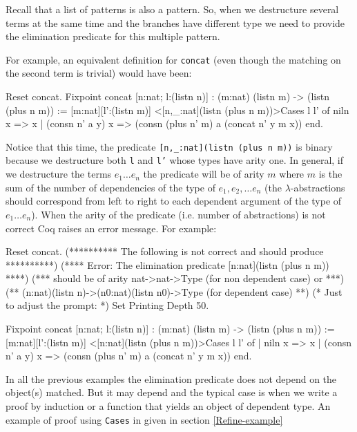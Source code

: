Recall that a list of patterns is also a pattern. So, when
we destructure several terms at the same time and the branches have
different type  we need to provide
the elimination predicate for this multiple pattern.

For example, an equivalent definition for \texttt{concat} (even though the matching on the second term is trivial) would have
been:

\begin{coq_example}
Reset concat.
Fixpoint concat [n:nat; l:(listn n)] : (m:nat) (listn m) -> (listn (plus n m)) 
:= [m:nat][l':(listn m)] 
    <[n,_:nat](listn (plus n m))>Cases l l' of 
                     niln          x => x
                  | (consn n' a y) x => (consn (plus n' m) a (concat n' y m x))
                  end.
\end{coq_example}

Notice that this time, the predicate \texttt{[n,\_:nat](listn (plus n
  m))}  is binary because we
destructure both \texttt{l} and \texttt{l'} whose types have arity one.
In general, if we destructure the terms $e_1\ldots e_n$
the predicate will be of arity $m$ where $m$ is the sum of the
number of dependencies of the type of $e_1, e_2,\ldots e_n$ 
(the $\lambda$-abstractions
should correspond from left to right to each dependent argument of the
type of $e_1\ldots e_n$).
When the arity of the predicate (i.e. number of abstractions) is not
correct Coq raises an error message. For example:

\begin{coq_eval}
Reset concat.
(********** The following is not correct and should produce **********)
(**** Error: The elimination predicate [n:nat](listn (plus n m))  ****)
(*** should be of arity nat->nat->Type (for non dependent case) or ***)
(** (n:nat)(listn n)->(n0:nat)(listn n0)->Type (for dependent case) **)
(* Just to adjust the prompt: *) Set Printing Depth 50.
\end{coq_eval}

\begin{coq_example}
Fixpoint concat [n:nat; l:(listn n)] 
     : (m:nat) (listn m) -> (listn (plus n m)) := 
  [m:nat][l':(listn m)] 
   <[n:nat](listn (plus n m))>Cases l l' of 
        | niln          x => x
        | (consn n' a y) x => (consn (plus n' m) a (concat n' y m x))
        end.
\end{coq_example}

In all the previous examples the elimination predicate does not depend
on the object(s) matched. But it may depend and the typical case 
is when we write a proof by induction or a function that yields an
object of dependent type. An example of proof using \texttt{Cases} in
given in section \ref{Refine-example}


